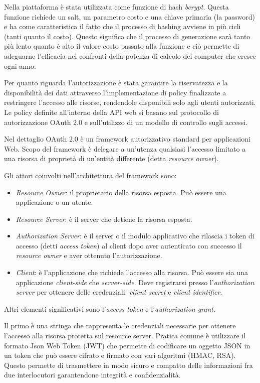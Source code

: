 Nella piattaforma è stata utilizzata come funzione di hash \textit{bcrypt}\cite{bcrypt}. Questa funzione richiede un salt, un parametro costo e una chiave primaria (la password) e ha come
caratteristica il fatto che il processo di hashing avviene in più cicli (tanti quanto il costo). Questo significa che il processo di generazione sarà tanto più lento quanto è alto il valore
costo passato alla funzione e ciò permette di adeguarne l'efficacia nei confronti della potenza di calcolo dei computer che cresce ogni anno.

Per quanto riguarda l'autorizzazione è stata garantire la riservatezza e la disponibilità dei dati
attraverso l'implementazione di policy finalizzate a restringere l'accesso alle risorse,
rendendole disponibili solo agli utenti autorizzati.
Le policy definite all'interno della API web si basano sul protocollo di autorizzazione OAuth 2.0 \cite{rfc6749} e sull'utilizzo di un
modello di controllo sugli accessi.

Nel dettaglio OAuth 2.0 è un framework autorizzativo standard per applicazioni Web.
Scopo del framework è delegare a un'utenza qualsiasi l'accesso limitato a una risorsa di proprietà di un'entità differente (detta \textit{resource owner}).

Gli attori coinvolti nell'architettura del framework sono:
\begin{itemize}
    \itemsep0em
    \item \textit{Resource Owner}: il proprietario della risorsa esposta. Può essere una applicazione o un utente.
    \item \textit{Resource Server}: è il server che detiene la risorsa esposta.
    \item \textit{Authorization Server}: è il server o il modulo applicativo che rilascia i token di accesso (detti \textit{access token}) al client dopo aver
          autenticato con successo il \textit{resource owner} e aver ottenuto l'autorizzazione.
    \item  \textit{Client}: è l'applicazione che richiede l'accesso alla risorsa. Può essere sia una applicazione \textit{client-side} che \textit{server-side}.
          Deve registrarsi presso l'\textit{authorization server} per ottenere delle credenziali: \textit{client secret} e \textit{client identifier}.
\end{itemize}

Altri elementi significativi sono l'\textit{access token} e l'\textit{authorization grant}.

Il primo è una stringa che rappresenta le credenziali necessarie per ottenere l'accesso alla risorsa protetta sul resource server.
Pratica comune è utilizzare il formato Json Web Token\cite{rfc7519} (JWT) che permette di codificare un oggetto JSON in un token
che può essere cifrato e firmato con vari algoritmi (HMAC, RSA). Questo permette di trasmettere in modo sicuro e compatto delle informazioni
fra due interlocutori garantendone integrità e confidenzialità.

